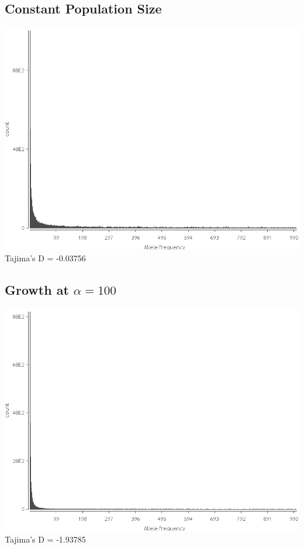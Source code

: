 \documentclass{article}
\begin{document}
\section{}
\section{}
\subsection{Constant Population Size}
\includegraphics[width=\textwidth]{constant_size}
Tajima's D = -0.03756
\subsection{Growth at $\alpha = 100$}
\includegraphics[width=\textwidth]{growth}
Tajima's D = -1.93785
\end{document}
